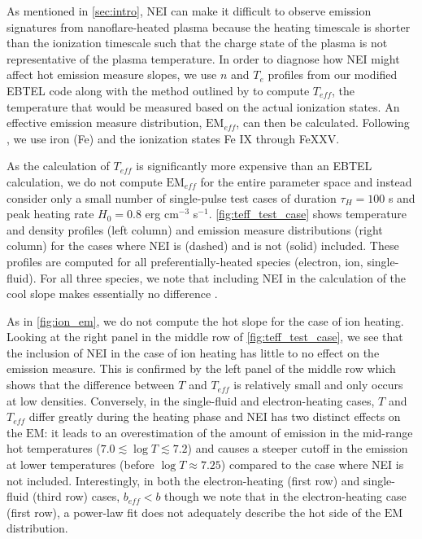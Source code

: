 \documentclass[apj]{emulateapj}
\begin{document}
	\par As mentioned in \autoref{sec:intro}, NEI can make it difficult to observe emission signatures from nanoflare-heated plasma because the heating timescale is shorter than the ionization timescale such that the charge state of the plasma is not representative of the plasma temperature. In order to diagnose how NEI might affect hot emission measure slopes, we use $n$ and $T_e$ profiles from our modified EBTEL code along with the method outlined by \citet{bradshaw_numerical_2009} to compute $T_{eff}$, the temperature that would be measured based on the actual ionization states. An effective emission measure distribution, $\mathrm{EM}_{eff}$, can then be calculated. Following , we use iron (Fe) and the ionization states Fe IX through FeXXV.
	\par As the calculation of $T_{eff}$ is significantly more expensive than an EBTEL calculation, we do not compute $\mathrm{EM}_{eff}$ for the entire parameter space and instead consider only a small number of single-pulse test cases of duration $\tau_H=100$ s and peak heating rate $H_0=0.8$ erg cm$^{-3}$ s$^{-1}$. \autoref{fig:teff_test_case} shows temperature and density profiles (left column)  and emission measure distributions (right column) for the cases where NEI is (dashed) and is not (solid) included. These profiles are computed for all preferentially-heated species (electron, ion, single-fluid). For all three species, we note that including NEI in the calculation of the cool slope makes essentially no difference .
	\par As in \autoref{fig:ion_em}, we do not compute the hot slope for the case of ion heating. Looking at the right panel in the middle row of \autoref{fig:teff_test_case}, we see that the inclusion of NEI in the case of ion heating has little to no effect on the emission measure. This is confirmed by the left panel of the middle row which shows that the difference between $T$ and $T_{eff}$ is relatively small and only occurs at low densities. Conversely, in the single-fluid and electron-heating cases, $T$ and $T_{eff}$ differ greatly during the heating phase and NEI has two distinct effects on the $\mathrm{EM}$: it leads to an overestimation of the amount of emission in the mid-range hot temperatures ($7.0\lesssim\log{T}\lesssim7.2$) and causes a steeper cutoff in the emission at lower temperatures (before $\log{T}\approx7.25$) compared to the case where NEI is not included. Interestingly, in both the electron-heating (first row) and single-fluid (third row) cases, $b_{eff}<b$ though we note that in the electron-heating case (first row), a power-law fit does not adequately describe the hot side of the $\mathrm{EM}$ distribution.
\end{document}
